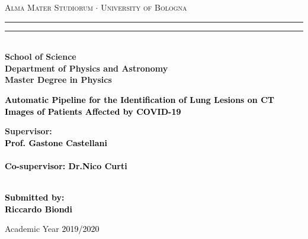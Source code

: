 \begin{titlepage}
%
%
%
%
\begin{center}
{{\Large{\textsc{Alma Mater Studiorum $\cdot$ University of  Bologna}}}} 
\rule[0.1cm]{15.8cm}{0.1mm}
\rule[0.5cm]{15.8cm}{0.6mm}
\\\vspace{3mm}
{\small{\bf School of Science \\
Department of Physics and Astronomy\\
Master Degree in Physics}}
\end{center}

\vspace{23mm}

\begin{center}\textcolor{black}{
%
%
{\LARGE{\bf Automatic Pipeline for the Identification of Lung Lesions on CT Images of Patients Affected by COVID-19}}\\
}\end{center}

\vspace{50mm} \par \noindent

\begin{minipage}[t]{0.49\textwidth}
%
%
{\large{\bf Supervisor: \vspace{2mm}\\\textcolor{black}{
Prof. Gastone Castellani}\\\\
%
%
%
\textcolor{black}{
\bf Co-supervisor:
\vspace{5mm}
Dr.Nico Curti}}}\\\\
\end{minipage}

%
\hfill
%
\begin{minipage}[t]{0.47\textwidth}\raggedleft \textcolor{black}{
{\large{\bf Submitted by:
\vspace{2mm}\\
%
%
\textcolor{black}{
Riccardo Biondi}}}
}
\end{minipage}

\vspace{40mm}

\begin{center}
%
%
Academic Year \textcolor{black}{ 2019/2020}
\end{center}

\end{titlepage}


